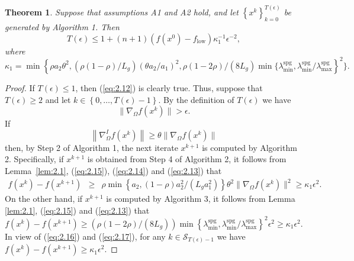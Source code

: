 \documentclass[11pt]{article}
\newtheorem{theorem}{Theorem}[section]
\begin{document}
\begin{theorem} \label{thm:2.1}
Suppose that assumptions A1 and A2 hold, and let $\left\{x^{k}\right\}_{k=0}^{T(\epsilon)}$ be generated by Algorithm 1. Then
\begin{equation}
T(\epsilon)\leq 1+(n+1) (f(x^{0})-f_{\mathrm{low}}) \kappa_{1}^{-1} \epsilon^{-2},
\label{eq:2.12}
\end{equation}
where
\begin{equation}
\kappa_1 = \min\left\{\rho a_{2}\theta^{2},(\rho(1-\rho)/L_{g})(\theta a_{2}/a_{1})^{2}, \rho(1-2\rho)/(8L_{g})\min\{\lambda_{\min}^{\mathrm{spg}},\lambda_{\min}^{\mathrm{spg}}/\lambda_{\max}^{\mathrm{spg}}\right\}^{2}\}.
\label{eq:2.13}
\end{equation}
\end{theorem}
\begin{proof}
If $T(\epsilon)\leq 1$, then (\ref{eq:2.12}) is clearly true. Thus, suppose that $T(\epsilon)\geq 2$ and let $k\in\left\{0,\dots,T(\epsilon)-1\right\}$. By the definition of $T(\epsilon)$ we have
\begin{equation} \label{eq:2.14}
\|\nabla_{\Omega}f(x^{k})\|>\epsilon.
\end{equation}
If 
\begin{equation} \label{eq:2.15}
\left\|\nabla_{\Omega}^{I}f(x^{k})\right\|\geq \theta\|\nabla_{\Omega}f(x^{k})\|
\end{equation}
then, by Step 2 of Algorithm 1, the next iterate $x^{k+1}$ is computed by Algorithm 2. Specifically, if $x^{k+1}$ is obtained from Step 4 of Algorithm 2, it follows from Lemma~\ref{lem:2.1}, (\ref{eq:2.15}), (\ref{eq:2.14}) and (\ref{eq:2.13}) that
\begin{eqnarray}
f(x^{k})-f(x^{k+1})
&\geq &\rho\min\left\{a_{2},(1-\rho)a_{2}^{2}/(L_{g}a_{1}^{2})\right\}\theta^{2}\|\nabla_{\Omega}f(x^{k})\|^{2}
\geq \kappa_{1}\epsilon^{2}.
\label{eq:2.16}
\end{eqnarray}
On the other hand, if $x^{k+1}$ is computed by Algorithm 3, it follows from Lemma \ref{lem:2.1}, (\ref{eq:2.15}) and (\ref{eq:2.13}) that
\begin{equation} \label{eq:2.17}
f(x^{k})-f(x^{k+1})\geq (\rho(1-2\rho)/(8L_{g}))\min\left\{\lambda_{\min}^{\mathrm{spg}},\lambda_{\min}^{\mathrm{spg}}/\lambda_{\max}^{\mathrm{spg}}\right\}^{2}\epsilon^{2}\geq \kappa_{1}\epsilon^{2}.
\end{equation}
In view of (\ref{eq:2.16}) and (\ref{eq:2.17}), for any $k\in\mathcal{S}_{T(\epsilon)-1}$ we have $f(x^{k})-f(x^{k+1})\geq \kappa_{1}\epsilon^{2}$.

\end{proof}
\end{document}

